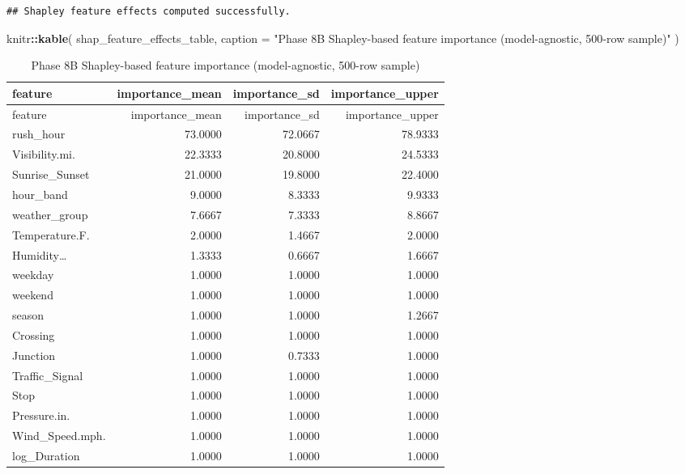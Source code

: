 \documentclass[
]{article}
\newenvironment{Shaded}{\begin{snugshade}}{\end{snugshade}}
\newcommand{\AttributeTok}[1]{\textcolor[rgb]{0.13,0.29,0.53}{#1}}
\newcommand{\FunctionTok}[1]{\textcolor[rgb]{0.13,0.29,0.53}{\textbf{#1}}}
\newcommand{\NormalTok}[1]{#1}
\newcommand{\SpecialCharTok}[1]{\textcolor[rgb]{0.81,0.36,0.00}{\textbf{#1}}}
\newcommand{\StringTok}[1]{\textcolor[rgb]{0.31,0.60,0.02}{#1}}
\begin{document}
\begin{verbatim}
## Shapley feature effects computed successfully.
\end{verbatim}

\begin{Shaded}
\begin{Highlighting}[]
\NormalTok{knitr}\SpecialCharTok{::}\FunctionTok{kable}\NormalTok{(}
\NormalTok{  shap\_feature\_effects\_table,}
  \AttributeTok{caption =} \StringTok{"Phase 8B Shapley{-}based feature importance (model{-}agnostic, 500{-}row sample)"}
\NormalTok{)}
\end{Highlighting}
\end{Shaded}

\begin{longtable}[]{@{}lrrr@{}}
\caption{Phase 8B Shapley-based feature importance (model-agnostic,
500-row sample)}\tabularnewline
\toprule\noalign{}
feature & importance\_mean & importance\_sd & importance\_upper \\
\midrule\noalign{}
\endfirsthead
\toprule\noalign{}
feature & importance\_mean & importance\_sd & importance\_upper \\
\midrule\noalign{}
\endhead
\bottomrule\noalign{}
\endlastfoot
rush\_hour & 73.0000 & 72.0667 & 78.9333 \\
Visibility.mi. & 22.3333 & 20.8000 & 24.5333 \\
Sunrise\_Sunset & 21.0000 & 19.8000 & 22.4000 \\
hour\_band & 9.0000 & 8.3333 & 9.9333 \\
weather\_group & 7.6667 & 7.3333 & 8.8667 \\
Temperature.F. & 2.0000 & 1.4667 & 2.0000 \\
Humidity\ldots{} & 1.3333 & 0.6667 & 1.6667 \\
weekday & 1.0000 & 1.0000 & 1.0000 \\
weekend & 1.0000 & 1.0000 & 1.0000 \\
season & 1.0000 & 1.0000 & 1.2667 \\
Crossing & 1.0000 & 1.0000 & 1.0000 \\
Junction & 1.0000 & 0.7333 & 1.0000 \\
Traffic\_Signal & 1.0000 & 1.0000 & 1.0000 \\
Stop & 1.0000 & 1.0000 & 1.0000 \\
Pressure.in. & 1.0000 & 1.0000 & 1.0000 \\
Wind\_Speed.mph. & 1.0000 & 1.0000 & 1.0000 \\
log\_Duration & 1.0000 & 1.0000 & 1.0000 \\
\end{longtable}
\end{document}
